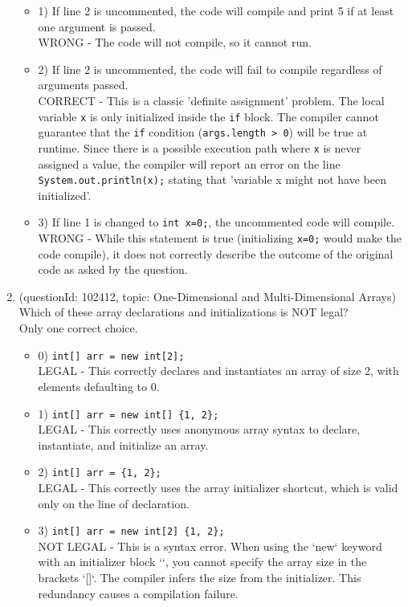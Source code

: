 \documentclass[12pt]{article}
\begin{document}
\begin{enumerate}[label=(\arabic*)]
\begin{itemize}
\item 1) If line 2 is uncommented, the code will compile and print 5 if at least one argument is passed.
 \\ 
WRONG - The code will not compile, so it cannot run.

\item 2) If line 2 is uncommented, the code will fail to compile regardless of arguments passed.
 \\ 
CORRECT - This is a classic 'definite assignment' problem. The local variable \verb|x| is only initialized inside the \verb|if| block. The compiler cannot guarantee that the \verb|if| condition (\verb|args.length > 0|) will be true at runtime. Since there is a possible execution path where \verb|x| is never assigned a value, the compiler will report an error on the line \verb|System.out.println(x);| stating that 'variable x might not have been initialized'.

\item 3) If line 1 is changed to \verb|int x=0;|, the uncommented code will compile.
 \\ 
WRONG - While this statement is true (initializing \verb|x=0;| would make the code compile), it does not correctly describe the outcome of the original code as asked by the question.

\end{itemize}
\item (questionId: 102412, topic: One-Dimensional and Multi-Dimensional Arrays) \\ 
Which of these array declarations and initializations is NOT legal?
\\ \noindent Only one correct choice. 
\begin{itemize}
\item 0) \verb|int[] arr = new int[2];|
 \\ 
LEGAL - This correctly declares and instantiates an array of size 2, with elements defaulting to 0.

\item 1) \verb|int[] arr = new int[] {1, 2};|
 \\ 
LEGAL - This correctly uses anonymous array syntax to declare, instantiate, and initialize an array.

\item 2) \verb|int[] arr = {1, 2};|
 \\ 
LEGAL - This correctly uses the array initializer shortcut, which is valid only on the line of declaration.

\item 3) \verb|int[] arr = new int[2] {1, 2};|
 \\ 
NOT LEGAL - This is a syntax error. When using the `new` keyword with an initializer block `{}`, you cannot specify the array size in the brackets `[]`. The compiler infers the size from the initializer. This redundancy causes a compilation failure.


\end{itemize}
\end{enumerate}
\end{document}
